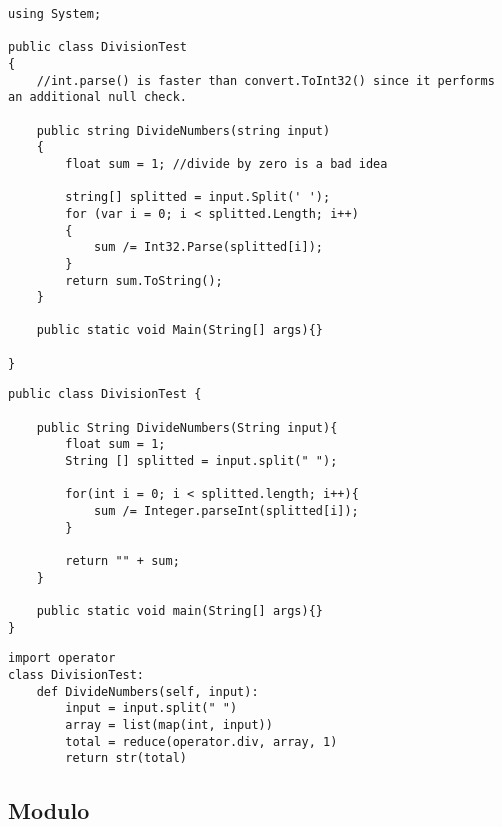 	\lstset{style=sharpc}
	\begin{lstlisting}
using System;

public class DivisionTest
{
    //int.parse() is faster than convert.ToInt32() since it performs an additional null check.

    public string DivideNumbers(string input)
    {
        float sum = 1; //divide by zero is a bad idea

        string[] splitted = input.Split(' ');
        for (var i = 0; i < splitted.Length; i++)
        {
            sum /= Int32.Parse(splitted[i]);
        }
        return sum.ToString();
    }
	
	public static void Main(String[] args){}

}

	\end{lstlisting}

	\lstset{style=java}
	\begin{lstlisting}
public class DivisionTest {
	
	public String DivideNumbers(String input){
		float sum = 1;
		String [] splitted = input.split(" ");
		
		for(int i = 0; i < splitted.length; i++){
			sum /= Integer.parseInt(splitted[i]);
		}
		
		return "" + sum;
	}
	
	public static void main(String[] args){}
}
	\end{lstlisting}


	\lstset{style=python}
	\begin{lstlisting}
import operator
class DivisionTest:
    def DivideNumbers(self, input):
        input = input.split(" ")
        array = list(map(int, input))
        total = reduce(operator.div, array, 1)
        return str(total)
	\end{lstlisting}



\subsection{Modulo}

